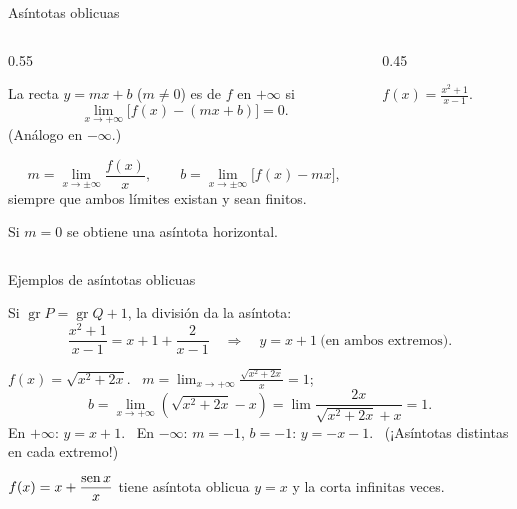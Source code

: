 \documentclass[10pt,aspectratio=169]{beamer}
\begin{document}
\begin{frame}{Asíntotas oblicuas}
  \begin{columns}
    \begin{column}{0.55\textwidth}
      \begin{definicion}
        La recta $y=mx+b$ ($m\neq0$) es  de $f$ en $+\infty$ si
        \[ \lim_{x\to+\infty}\big[f(x)-(mx+b)\big]=0. \]
        (Análogo en $-\infty$.)
      \end{definicion}
      \begin{teorema}[cálculo]
        \[ m=\lim_{x\to\pm\infty}\frac{f(x)}{x},\qquad b=\lim_{x\to\pm\infty}\big[f(x)-mx\big], \]
        siempre que ambos límites existan y sean finitos.
      \end{teorema}
      \small Si $m=0$ se obtiene una asíntota horizontal.
    \end{column}
    \begin{column}{0.45\textwidth}
      \centering

      \small $f(x)=\frac{x^2+1}{x-1}$.
    \end{column}
  \end{columns}
\end{frame}

\begin{frame}{Ejemplos de asíntotas oblicuas}
  \begin{ejemplo}
    Si $\operatorname{gr}P=\operatorname{gr}Q+1$, la división da la asíntota:
    \[ \frac{x^2+1}{x-1}=x+1+\frac{2}{x-1}\quad\Rightarrow\quad y=x+1\ \text{(en ambos extremos)}. \]
  \end{ejemplo}
  \begin{ejemplo}
    $f(x)=\sqrt{x^2+2x}$. \ $m=\lim_{x\to+\infty}\frac{\sqrt{x^2+2x}}{x}=1$;
    \[ b=\lim_{x\to+\infty}\left(\sqrt{x^2+2x}-x\right)=\lim\frac{2x}{\sqrt{x^2+2x}+x}=1. \]
    En $+\infty$: $y=x+1$. \ En $-\infty$: $m=-1$, $b=-1$: $y=-x-1$. \ (¡Asíntotas distintas en cada extremo!)
  \end{ejemplo}
  \begin{ejemplo}[10]
    $f(x)=x+\dfrac{\operatorname{sen} x}{x}$ tiene asíntota oblicua $y=x$ y la corta infinitas veces.
  \end{ejemplo}
\end{frame}
\end{document}
